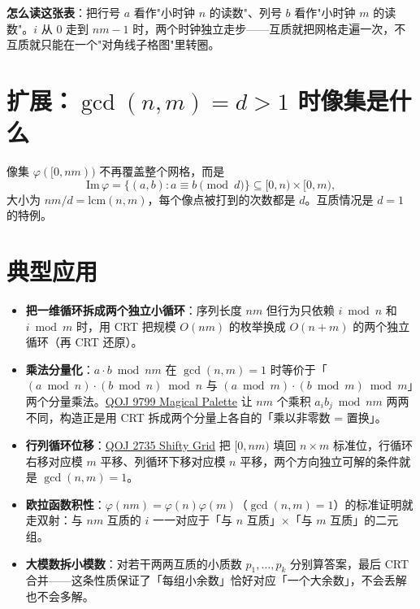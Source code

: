 \documentclass{article}
\begin{document}
\textbf{怎么读这张表}：把行号 $a$ 看作"小时钟 $n$ 的读数"、列号 $b$ 看作"小时钟 $m$ 的读数"。$i$ 从 0 走到 $nm - 1$ 时，两个时钟独立走步——互质就把网格走遍一次，不互质就只能在一个"对角线子格图"里转圈。

\section{扩展：$\gcd(n, m) = d > 1$ 时像集是什么}

像集 $\varphi([0, nm))$ 不再覆盖整个网格，而是
$$\mathrm{Im}\,\varphi = \{(a, b) : a \equiv b \pmod d\} \subseteq [0, n) \times [0, m),$$
大小为 $nm / d = \mathrm{lcm}(n, m)$，每个像点被打到的次数都是 $d$。互质情况是 $d = 1$ 的特例。

\section{典型应用}

\begin{itemize}
    \item \textbf{把一维循环拆成两个独立小循环}：序列长度 $nm$ 但行为只依赖 $i \bmod n$ 和 $i \bmod m$ 时，用 CRT 把规模 $O(nm)$ 的枚举换成 $O(n + m)$ 的两个独立循环（再 CRT 还原）。
    \item \textbf{乘法分量化}：$a \cdot b \bmod nm$ 在 $\gcd(n, m) = 1$ 时等价于「$(a \bmod n) \cdot (b \bmod n) \bmod n$ 与 $(a \bmod m) \cdot (b \bmod m) \bmod m$」两个分量乘法。\href{https://vjudge.net/problem/qoj-9799}{QOJ 9799 Magical Palette} 让 $n m$ 个乘积 $a_i b_j \bmod nm$ 两两不同，构造正是用 CRT 拆成两个分量上各自的「乘以非零数 = 置换」。
    \item \textbf{行列循环位移}：\href{https://vjudge.net/problem/qoj-2735}{QOJ 2735 Shifty Grid} 把 $[0, nm)$ 填回 $n \times m$ 标准位，行循环右移对应模 $m$ 平移、列循环下移对应模 $n$ 平移，两个方向独立可解的条件就是 $\gcd(n, m) = 1$。
    \item \textbf{欧拉函数积性}：$\varphi(nm) = \varphi(n) \varphi(m)$（$\gcd(n, m) = 1$）的标准证明就走双射：与 $nm$ 互质的 $i$ 一一对应于「与 $n$ 互质」$\times$「与 $m$ 互质」的二元组。
    \item \textbf{大模数拆小模数}：对若干两两互质的小质数 $p_1, \dots, p_k$ 分别算答案，最后 CRT 合并——这条性质保证了「每组小余数」恰好对应「一个大余数」，不会丢解也不会多解。
\end{itemize}
\end{document}
